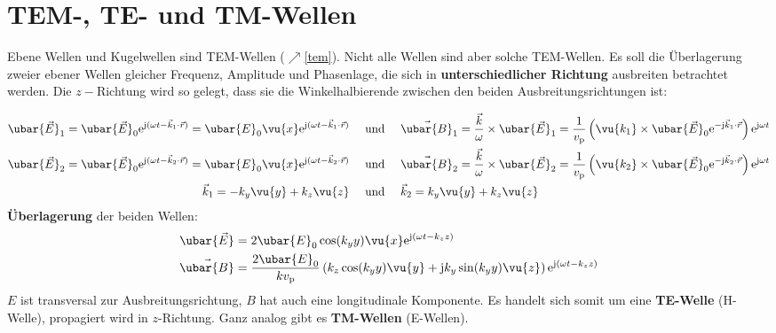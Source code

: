   \section{TEM-, TE- und TM-Wellen}
	 Ebene Wellen und Kugelwellen sind TEM-Wellen ($\nearrow$\ref{tem}). Nicht alle Wellen sind aber solche TEM-Wellen. Es soll die Überlagerung zweier ebener Wellen gleicher Frequenz, Amplitude und Phasenlage, die sich in \textbf{unterschiedlicher Richtung} ausbreiten betrachtet werden. Die $z-$Richtung wird so gelegt, dass sie die Winkelhalbierende zwischen den beiden Ausbreitungsrichtungen ist:
		        \begin{center}
			        
		        \end{center}
		   \begin{align*}\ubar{\vec{E}}_1 = \ubar{\vec{E}}_0  \mathrm{e}^{\mathrm{j}(\omega t - \vec{k}_1\cdot\vec{r} )} = \ubar{E}_{0} \vu{x}  \mathrm{e}^{\mathrm{j}(\omega t - \vec{k}_1\cdot\vec{r} )} &\quad \text{ und }\quad
		         \vec{\ubar{B}}_1 = \dfrac{\vec{k}}{\omega}\times\ubar{\vec{E}}_1=\dfrac{1}{ v_\mathrm{p}} \left( \vu{{k_1}} \times \ubar{\vec{E}}_0  \mathrm{e}^{-\mathrm{j}\vec{k}_1\cdot\vec{r} }\right)  \mathrm{e}^{\mathrm{j}\omega t } \\
		  \ubar{\vec{E}}_2 = \ubar{\vec{E}}_0  \mathrm{e}^{\mathrm{j}(\omega t - \vec{k}_2\cdot\vec{r} )} = \ubar{E}_{0}\vu{x} \mathrm{e}^{\mathrm{j}(\omega t - \vec{k}_2\cdot\vec{r} )}&\quad \text{ und }\quad \vec{\ubar{B}}_2 = \dfrac{\vec{k}}{\omega}\times\ubar{\vec{E}}_2=\dfrac{1}{ v_\mathrm{p}} \left( \vu{{k_2}} \times \ubar{\vec{E}}_0  \mathrm{e}^{-\mathrm{j}\vec{k}_2\cdot\vec{r} }\right)  \mathrm{e}^{\mathrm{j}\omega t }\\
		  \vec{k}_1 = - k_y\vu{y} +  k_z\vu{z} & \quad \text{ und }\quad \vec{k}_2 =  k_y\vu{y} +  k_z\vu{z}  \end{align*}
		   \textbf{Überlagerung} der beiden Wellen:
		        \begin{equation*}\begin{split}
				        \ubar{\vec{E}} &= 2\ubar{E}_{0}\cos( k_yy) \vu{x}  \mathrm{e}^{\mathrm{j}(\omega t -  k_z z)} \\
				        \vec{\ubar{B}} &= \frac{2\ubar{E}_{0}}{ k  v_\mathrm{p}} \left(  k_z \cos( k_y y) \vu{y} + \mathrm{j} k_y\sin( k_y y) \vu{z}\right)  \mathrm{e}^{\mathrm{j}(\omega t -  k_z z)}
			        \end{split}\end{equation*}
		 $E$ ist transversal zur Ausbreitungsrichtung, $B$ hat auch eine longitudinale Komponente. Es handelt sich somit um eine \textbf{TE-Welle} (H-Welle), propagiert wird in $z$-Richtung. Ganz analog gibt es \textbf{TM-Wellen} (E-Wellen).\\
